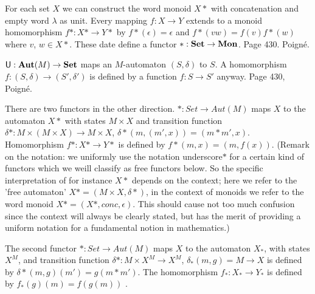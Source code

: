 
\begin{example}

  For each set $X$ we can construct the word monoid $X*$ with concatenation
  and empty word $\lambda$ as unit. Every mapping $f: X \to Y$ extends to a
  monoid homomorphism $f*: X* \to Y*$ by $f*(\epsilon) = \epsilon$ and
  $f*(vw) = f(v)f*(w)$ where $v$, $w \in X*$. These date define a functor
  $*: \mathbf{Set} \to \mathbf{Mon}$.
  Page 430. Poigné.

\end{example}

\begin{example}[Automata]

  \label{ex:functor-automata-1}


  $\mathsf{U}: \mathbf{Aut}(M) \to \mathbf{Set}$ maps an $M$-automaton $(S,
  \delta)$ to $S$. A homomorphism $f: (S, \delta) \to (S', \delta')$ is
  defined by a function $f: S \to S'$ anyway.
  Page 430, Poigné.

\end{example}

\begin{example}[Automata]

  \label{ex:functor-automata-2}


  There are two functors in the other direction. $*: Set \to Aut(M)$ maps $X$
  to the automaton $X*$ with states $M \times X$ and transition function
  $\delta*: M \times (M \times X) \to M \times X$, $\delta*(m, (m', x)) =
  (m*m',x)$. Homomorphism $f*: X* \to Y*$ is defined by $f*(m,x) = (m,f(x))$.
  (Remark on the notation: we uniformly use the notation underscore$*$ for a
  certain kind of functors which we weill classify as free functors below. So
  the specific interpretation of for instance $X*$ depends on the context;
  here we refer to the 'free automaton' $X* = (M \times X, \delta*)$, in the
  context of monoids we refer to the word monoid $X* = (X*, conc, \epsilon)$.
  This should cause not too much confusion since the context will always be
  clearly stated, but has the merit of providing a uniform notation for a
  fundamental notion in mathematics.)

  The second functor $* : Set \to Aut(M)$ maps $X$ to the automaton $X_*$,
  with states $X^M$, and transition function $\delta*: M \times X^M \to X^M$,
  $\delta_*(m,g) = M \to X$ is defined by $\delta*(m,g)(m') = g(m*m')$. The
  homomorphism $f_*: X_* \to Y_*$ is defined by $f_*(g)(m) = f(g(m))$
  \parencite[430]{poigne-1992}.

\end{example}

